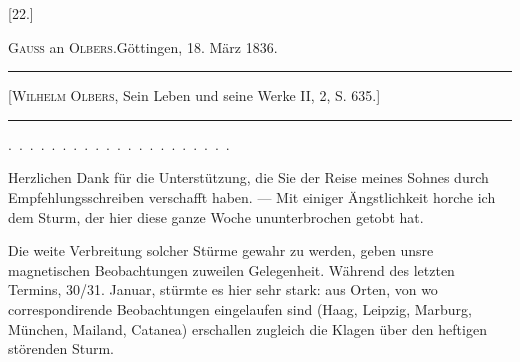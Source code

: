 \clearpage\begingroup{}\HistoricalFoot{}{14\textsuperscript{*}}
\begin{center}[22.]\end{center}
\begin{center}\textsc{Gauss} an \textsc{Olbers}.\quad Göttingen, 18. März 1836.\end{center}
\begin{center}\begin{minipage}{.88\linewidth}\centering\hrule\vspace{3pt}
\small [\textsc{Wilhelm Olbers}, Sein Leben und seine Werke II, 2, S. 635.]
\par\vspace{3pt}\hrule\end{minipage}\end{center}
\noindent .\ .\ .\ .\ .\ .\ .\ .\ .\ .\ .\ .\ .\ .\ .\ .\ .\ .\ .\ .\ .\par
\indent Herzlichen Dank für die Unterstützung, die Sie der Reise meines Sohnes
durch Empfehlungsschreiben verschafft haben. — Mit einiger Ängstlichkeit
horche ich dem Sturm, der hier diese ganze Woche ununterbrochen getobt hat.

Die weite Verbreitung solcher Stürme gewahr zu werden, geben unsre
magnetischen Beobachtungen zuweilen Gelegenheit. Während des letzten Termins,
30/31. Januar, stürmte es hier sehr stark: aus  Orten, von wo
correspondirende Beobachtungen eingelaufen sind (Haag, Leipzig, Marburg,
München, Mailand, Catanea) erschallen zugleich die Klagen über den heftigen
störenden Sturm.

